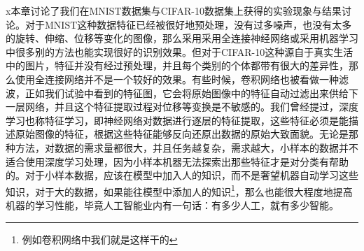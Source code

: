 x本章讨论了我们在MNIST数据集与CIFAR-10数据集上获得的实验现象与结果讨论。对于MNIST这种数据特征已经被很好地预处理，没有过多噪声，也没有太多的旋转、伸缩、位移等变化的图像，那么采用采用全连接神经网络或采用机器学习中很多别的方法也能实现很好的识别效果。但对于CIFAR-10这种源自于真实生活中的图片，特征并没有经过预处理，并且每个类别的个体都带有很大的差异性，那么使用全连接网络并不是一个较好的效果。有些时候，卷积网络也被看做一种滤波，正如我们试验中看到的特征图，它会将原始图像中的特征自动过滤出来供给下一层网络，并且这个特征提取过程对位移等变换是不敏感的。我们曾经提过，深度学习也称特征学习，即神经网络对数据进行逐层的特征提取，这些特征必须是能描述原始图像的特征，根据这些特征能够反向还原出数据的原始大致面貌。无论是那种方法，对数据的需求量都很大，并且任务越复杂，需求越大，小样本的数据并不适合使用深度学习处理，因为小样本机器无法探索出那些特征才是对分类有帮助的。对于小样本数据，应该在模型中加入人的知识，而不是奢望机器自动学习这些知识，对于大的数据，如果能往模型中添加人的知识\footnote{例如卷积网络中我们就是这样干的}，那么也能很大程度地提高机器的学习性能，毕竟人工智能业内有一句话：有多少人工，就有多少智能。